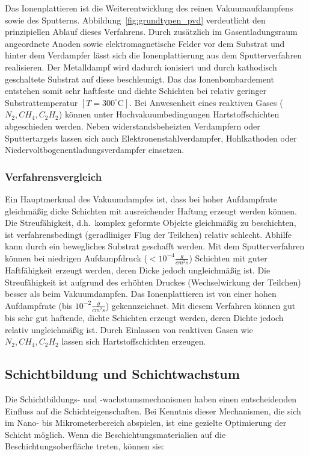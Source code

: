 \documentclass[12pt,a4paper,bibliography=totocnumbered,listof=totocnumbered,fleqn]{scrartcl}
\begin{document}
Das Ionenplattieren ist die Weiterentwicklung des reinen Vakuumaufdampfens sowie des Sputterns.
Abbildung~\ref{fig:grundtypen_pvd} verdeutlicht den prinzipiellen Ablauf dieses Verfahrens.
Durch zusätzlich im Gasentladungsraum angeordnete Anoden sowie elektromagnetische Felder vor dem Substrat und hinter dem Verdampfer lässt sich die Ionenplattierung aus dem Sputterverfahren realisieren.
Der Metalldampf wird dadurch ionisiert und durch kathodisch geschaltete Substrat auf diese beschleunigt.
Das das Ionenbombardement entstehen somit sehr haftfeste und dichte Schichten bei relativ geringer Substrattemperatur $[T=300^\circ\text{C}]$.
Bei Anwesenheit eines reaktiven Gases ($N_{2}, CH_{4}, C_{2}H_{2}$) können unter Hochvakuumbedingungen Hartstoffschichten abgeschieden werden.
Neben widerstandsbeheizten Verdampfern oder Sputtertargets lassen sich auch Elektronenstahlverdampfer, Hohlkathoden oder Niedervoltbogenentladungsverdampfer einsetzen.

\subsubsection{Verfahrensvergleich}

Ein Hauptmerkmal des Vakuumdampfes ist, dass bei hoher Aufdampfrate gleichmäßig dicke Schichten mit ausreichender Haftung erzeugt werden können.
Die Streufähigkeit, d.h.\ komplex geformte Objekte gleichmäßig zu beschichten, ist verfahrensbedingt (geradliniger Flug der Teilchen) relativ schlecht.
Abhilfe kann durch ein bewegliches Substrat geschafft werden.
Mit dem Sputterverfahren können bei niedrigen Aufdampfdruck ($< 10^{-4}\frac{g}{cm^{2}s}$) Schichten mit guter Haftfähigkeit erzeugt werden, deren Dicke jedoch ungleichmäßig ist.
Die Streufähigkeit ist aufgrund des erhöhten Druckes (Wechselwirkung der Teilchen) besser als beim Vakuumdampfen.
Das Ionenplattieren ist von einer hohen Aufdampfrate (bis $10^{-2}\frac{g}{cm^{2}s}$) gekennzeichnet.
Mit diesem Verfahren können gut bis sehr gut haftende, dichte Schichten erzeugt werden, deren Dichte jedoch relativ ungleichmäßig ist.
Durch Einlassen von reaktiven Gasen wie $N_{2}, CH_{4}, C_{2}H_{2}$ lassen sich Hartstoffschichten erzeugen.

\subsection{Schichtbildung und Schichtwachstum}

Die Schichtbildungs- und -wachstumsmechanismen haben einen entscheidenden Einfluss auf die Schichteigenschaften.
Bei Kenntnis dieser Mechanismen, die sich im Nano- bis Mikrometerbereich abspielen, ist eine gezielte Optimierung der Schicht möglich.
Wenn die Beschichtungsmaterialien auf die Beschichtungsoberfläche treten, können sie:
\end{document}

